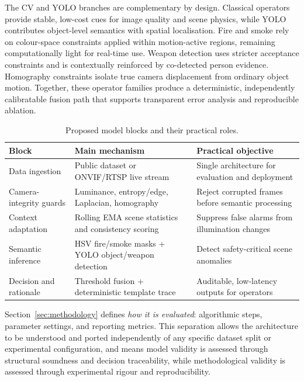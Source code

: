 \documentclass[a4paper,fleqn]{cas-dc}
\begin{document}
The CV and YOLO branches are complementary by design. Classical operators provide stable, low-cost cues for image quality and scene physics, while YOLO contributes object-level semantics with spatial localisation. Fire and smoke rely on colour-space constraints applied within motion-active regions, remaining computationally light for real-time use. Weapon detection uses stricter acceptance constraints and is contextually reinforced by co-detected person evidence. Homography constraints isolate true camera displacement from ordinary object motion. Together, these operator families produce a deterministic, independently calibratable fusion path that supports transparent error analysis and reproducible ablation.
 
\begin{table}[!ht]
\caption{Proposed model blocks and their practical roles.}
\label{tab:proposed-final-blocks}
\centering
\footnotesize
\setlength{\tabcolsep}{3pt}
\renewcommand{\arraystretch}{1.1}
\begin{tabularx}{\linewidth}{@{}p{1.75cm} >{\raggedright\arraybackslash}X >{\raggedright\arraybackslash}X@{}}
\toprule
\textbf{Block} & \textbf{Main mechanism} & \textbf{Practical objective} \\
\midrule
Data ingestion & Public dataset or ONVIF/RTSP live stream & Single architecture for evaluation and deployment \\
Camera-integrity guards & Luminance, entropy/edge, Laplacian, homography & Reject corrupted frames before semantic processing \\
Context adaptation & Rolling EMA scene statistics and consistency scoring & Suppress false alarms from illumination changes \\
Semantic inference & HSV fire/smoke masks + YOLO object/weapon detection & Detect safety-critical scene anomalies \\
Decision and rationale & Threshold fusion + deterministic template trace & Auditable, low-latency outputs for operators \\
\bottomrule
\end{tabularx}
\end{table}
 
 Section~\ref{sec:methodology} defines \emph{how it is evaluated}: algorithmic steps, parameter settings, and reporting metrics. This separation allows the architecture to be understood and ported independently of any specific dataset split or experimental configuration, and means model validity is assessed through structural soundness and decision traceability, while methodological validity is assessed through experimental rigour and reproducibility.
 
\end{document}

